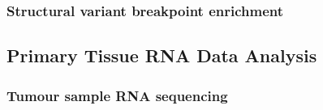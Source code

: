 
\subsubsection{Structural variant breakpoint enrichment}


\subsection{Primary Tissue RNA Data Analysis}

\subsubsection{Tumour sample RNA sequencing}


